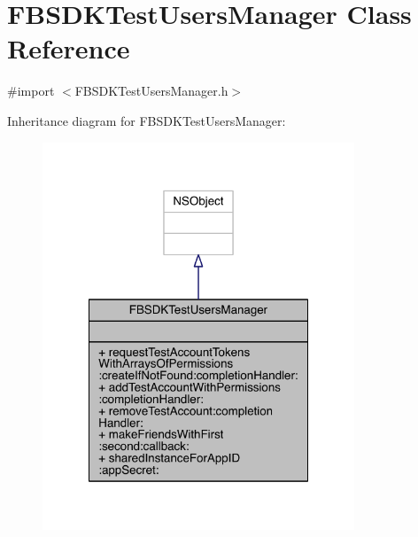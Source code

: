 \hypertarget{interface_f_b_s_d_k_test_users_manager}{\section{F\-B\-S\-D\-K\-Test\-Users\-Manager Class Reference}
\label{interface_f_b_s_d_k_test_users_manager}
}


{\ttfamily \#import $<$F\-B\-S\-D\-K\-Test\-Users\-Manager.\-h$>$}



Inheritance diagram for F\-B\-S\-D\-K\-Test\-Users\-Manager\-:
\nopagebreak
\begin{figure}[H]
\begin{center}
\leavevmode
\includegraphics[width=264pt]{interface_f_b_s_d_k_test_users_manager__inherit__graph}
\end{center}
\end{figure}


